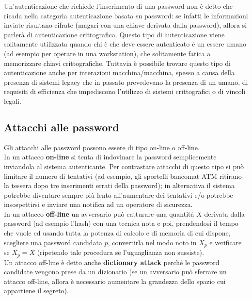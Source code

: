 Un'autenticazione che richiede l'inserimento di una password non è detto che ricada nella categoria autenticazione basata su password: se infatti le informazioni inviate risultano cifrate (magari con una chiave derivata dalla password), allora si parlerà di autenticazione crittografica.
\newline \newline
Questo tipo di autenticazione viene solitamente utilizzata quando chi è che deve essere autenticato è un essere umano (ad esempio per operare in una workstation), che solitamente fatica a memorizzare chiavi crittografiche. Tuttavia è possibile trovare questo tipo di autenticazione anche per interazioni macchina/macchina, spesso a causa della presenza di sistemi legacy che in passato prevedevano la presenza di un umano, di requisiti di efficienza che impediscono l'utilizzo di sistemi crittografici o di vincoli legali.
\subsection{Attacchi alle password}
Gli attacchi alle password possono essere di tipo on-line o off-line.\\

In un attacco \textbf{on-line} si tenta di indovinare la password semplicemente inviandola al sistema autenticante. Per contrastare attacchi di questo tipo si può limitare il numero di tentativi (ad esempio, gli sportelli bancomat ATM ritirano la tessera dopo tre inserimenti errati della password); in alternativa il sistema potrebbe diventare sempre più lento all'aumentare dei tentativi e/o potrebbe insospettirsi e inviare una notifica ad un operatore di sicurezza.\\

In un attacco \textbf{off-line} un avversario può catturare una quantità $X$ derivata dalla password (ad esempio l'hash) con una tecnica nota e poi, prendendosi il tempo che vuole ed usando tutta la potenza di calcolo e di memoria di cui dispone, scegliere una password candidata $p$, convertirla nel modo noto in $X_{p}$ e verificare se $X_{p} = X$ (ripetendo tale procedura se l'uguaglianza non sussiste).\\
Un attacco off-line è detto anche \textbf{dictionary attack} perché le password candidate vengono prese da un dizionario (se un avversario può sferrare un attacco off-line, allora è necessario aumentare la grandezza dello spazio cui appartiene il segreto).

